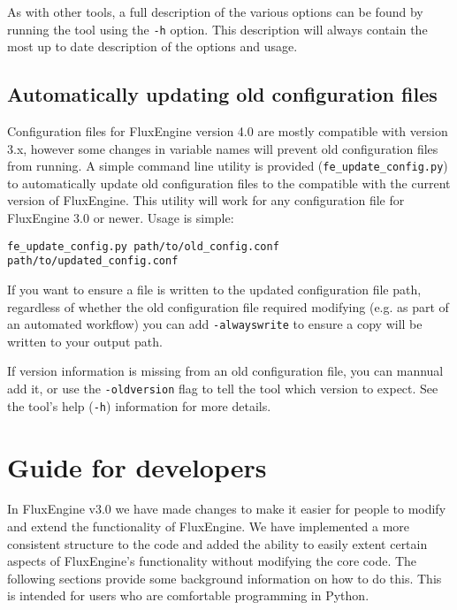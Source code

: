 \documentclass[]{scrartcl}
\begin{document}
As with other tools, a full description of the various options can be found by running the tool using the \texttt{-h} option. This description will always contain the most up to date description of the options and usage.


\subsection{Automatically updating old configuration files} \label{updating_configuration_files}
Configuration files for FluxEngine version 4.0 are mostly compatible with version 3.x, however some changes in variable names will prevent old configuration files from running. A simple command line utility is provided (\texttt{fe\_update\_config.py}) to automatically update old configuration files to the compatible with the current version of FluxEngine. This utility will work for any configuration file for FluxEngine 3.0 or newer. Usage is simple:
\begin{lstlisting}
fe_update_config.py path/to/old_config.conf path/to/updated_config.conf
\end{lstlisting}

If you want to ensure a file is written to the updated configuration file path, regardless of whether the old configuration file required modifying (e.g. as part of an automated workflow) you can add \texttt{-alwayswrite} to ensure a copy will be written to your output path.

If version information is missing from an old configuration file, you can mannual add it, or use the \texttt{-oldversion} flag to tell the tool which version to expect. See the tool's help (\texttt{-h}) information for more details.


\section{Guide for developers} \label{developer_notes}
In FluxEngine v3.0 we have made changes to make it easier for people to modify and extend the functionality of FluxEngine. We have implemented a more consistent structure to the code and added the ability to easily extent certain aspects of FluxEngine's functionality without modifying the core code. The following sections provide some background information on how to do this. This is intended for users who are comfortable programming in Python.
\end{document}

